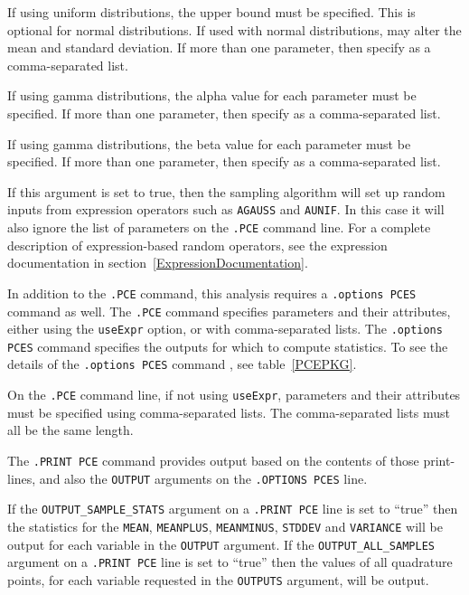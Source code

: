 \begin{Command}
\begin{Arguments}
If using uniform distributions, the upper bound must be specified.
This is optional for normal distributions.  If used with normal
distributions, may alter the mean and standard deviation.
If more than one parameter, then specify as a comma-separated list.

If using gamma distributions, the alpha value for each parameter
must be specified.  If more than one parameter, then specify as a
comma-separated list.

If using gamma distributions, the beta value for each parameter
must be specified.  If more than one parameter, then specify as a
comma-separated list.

If this argument is set to true, then the sampling algorithm will set up random 
  inputs from expression operators such as \verb|AGAUSS| and \verb|AUNIF|.  In 
  this case it will also ignore the list of parameters on the \verb|.PCE| command line.
  For a complete description of expression-based random operators, see the expression
  documentation in section~\ref{ExpressionDocumentation}.

\end{Arguments}

\comments

In addition to the \verb|.PCE| command, this analysis
requires a \verb|.options PCES| command as well.  The
\verb|.PCE| command specifies parameters and their
attributes, either using the \verb|useExpr| option, or with 
comma-separated lists.  The \verb|.options PCES| command specifies
the outputs for which to compute statistics.
To see the details of the \verb|.options PCES| command , see table~\ref{PCEPKG}.

On the \verb|.PCE| command line, if not using \verb|useExpr|, 
parameters and their
attributes must be specified using comma-separated lists. The
comma-separated lists must all be the same length.

The \texttt{.PRINT PCE} command provides output based on the contents
of those print-lines, and also the \texttt{OUTPUT}
arguments on the \texttt{.OPTIONS PCES} line. 

If the \texttt{OUTPUT\_SAMPLE\_STATS} argument on a \texttt{.PRINT PCE} line is
set to ``true'' then the statistics for the \texttt{MEAN}, \texttt{MEANPLUS},
\texttt{MEANMINUS}, \texttt{STDDEV} and \texttt{VARIANCE} will be output for each
variable in the \texttt{OUTPUT} argument.  
If the \texttt{OUTPUT\_ALL\_SAMPLES}
argument on a \texttt{.PRINT PCE} line is set to ``true'' then the values
of all quadrature points, for each variable requested
in the \texttt{OUTPUTS} argument, will be output.

\end{Command}

